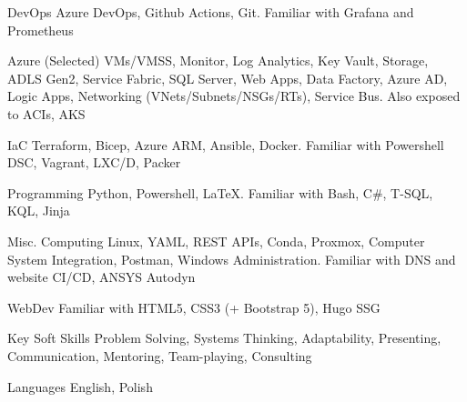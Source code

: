 \begin{cvskills}

  \cvskill
    {DevOps} 
    {Azure DevOps, Github Actions, Git. Familiar with Grafana and Prometheus} 

  \cvskill
    {Azure (Selected)} 
    {VMs/VMSS, Monitor, Log Analytics, Key Vault, Storage, ADLS Gen2, Service Fabric, SQL Server, Web Apps, Data Factory, Azure AD, Logic Apps, Networking (VNets/Subnets/NSGs/RTs), Service Bus. Also exposed to ACIs, AKS}

  \cvskill
    {IaC} 
    {Terraform, Bicep, Azure ARM, Ansible, Docker. Familiar with Powershell DSC, Vagrant, LXC/D, Packer} 

  \cvskill
    {Programming} 
    {Python, Powershell, \LaTeX. Familiar with Bash, C\#, T-SQL, KQL, Jinja}
    
  \cvskill
    {Misc. Computing} 
    {Linux, YAML, REST APIs, Conda, Proxmox, Computer System Integration, Postman, Windows Administration. Familiar with DNS and website CI/CD, ANSYS Autodyn} 

  \cvskill
    {WebDev} 
    {Familiar with HTML5, CSS3 (+ Bootstrap 5), Hugo SSG} 

  \cvskill
    {Key Soft Skills} 
    {Problem Solving, Systems Thinking, Adaptability, Presenting, Communication, Mentoring, Team-playing, Consulting} 

  \cvskill
    {Languages} 
    {English, Polish} 
    
\end{cvskills}
